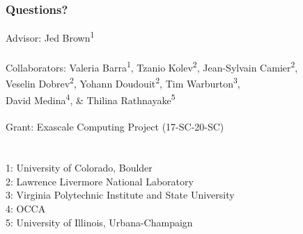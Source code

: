 \documentclass{beamer}
\begin{document}
\begin{frame}
\begin{center}
\frametitle{Questions?}

{\flushleft

Advisor: \hspace{8mm} Jed Brown\textsuperscript{1}\\

~\\

Collaborators: Valeria Barra\textsuperscript{1}, Tzanio Kolev\textsuperscript{2}, Jean-Sylvain Camier\textsuperscript{2},\\
\hspace{23mm} Veselin Dobrev\textsuperscript{2}, Yohann Doudouit\textsuperscript{2}, Tim Warburton\textsuperscript{3},\\
\hspace{23mm} David Medina\textsuperscript{4}, \& Thilina Rathnayake\textsuperscript{5}\\

~\\

Grant: \hspace{11mm} Exascale Computing Project (17-SC-20-SC)\\

~\\

~\\

\small{1: University of Colorado, Boulder\\
2: Lawrence Livermore National Laboratory\\
3: Virginia Polytechnic Institute and State University\\
4: OCCA\\
5: University of Illinois, Urbana-Champaign\\}}

\end{center}
\end{frame}


\begin{frame}[noframenumbering]
\titlepage %
\end{frame}


\end{document}
